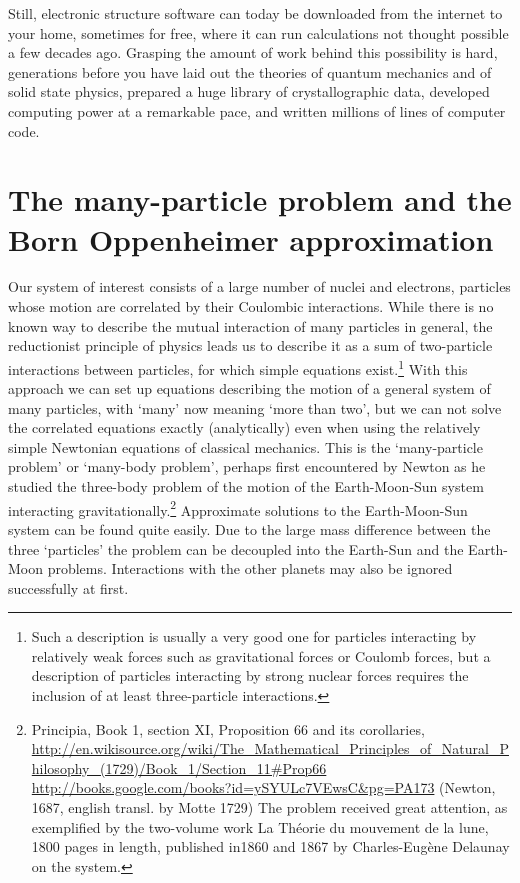 \documentclass[11pt]{scrbook}   %
\begin{document}
Still, electronic structure software can today be downloaded from the
internet to your home, sometimes for free, where it can run calculations 
not thought possible a few
decades ago. Grasping the amount of work behind this possibility is hard,
generations before you have laid out the theories of quantum mechanics and of
solid state physics, prepared a huge library of crystallographic data, 
developed computing power at a remarkable pace, and written millions of lines
of computer code. 




\section{The many-particle problem and the Born Oppenheimer approximation}

Our system of interest consists of a large number of nuclei and electrons, particles whose motion are correlated by their Coulombic interactions. 
While there is no known way to describe the mutual interaction of many particles in general, the reductionist principle of physics leads us to describe it as a sum of two-particle interactions between particles, for which simple equations exist.\footnote{
Such a description is usually a very good one for particles interacting by relatively weak forces such as gravitational forces or Coulomb forces, but a description of particles interacting by strong nuclear forces requires the inclusion of at least three-particle interactions.}
With this approach we can set up equations describing the motion of a general system of many particles, with `many' now meaning `more than two', but we can not solve the correlated equations exactly (analytically) even when using the relatively simple Newtonian equations of classical mechanics. 
This is the `many-particle problem' or `many-body problem', perhaps first encountered by Newton as he studied the three-body problem of the motion of the Earth-Moon-Sun system interacting gravitationally.\footnote{Principia, Book 1, section XI, Proposition 66 and its corollaries,
\url{http://en.wikisource.org/wiki/The_Mathematical_Principles_of_Natural_Philosophy_(1729)/Book_1/Section_11\#Prop66}
\url{http://books.google.com/books?id=ySYULc7VEwsC&pg=PA173}
(Newton, 1687, english transl. by Motte 1729) 
The problem received great attention, as exemplified by the two-volume work La Théorie du mouvement de la lune, 1800 pages in length, published in1860 and 1867 by Charles-Eugène Delaunay on the system.}
Approximate solutions to the Earth-Moon-Sun system can be found quite easily. 
Due to the large mass difference between the three `particles' the problem can be decoupled into the Earth-Sun and the Earth-Moon problems.
Interactions with the other planets may also be ignored successfully at first.
\end{document}
